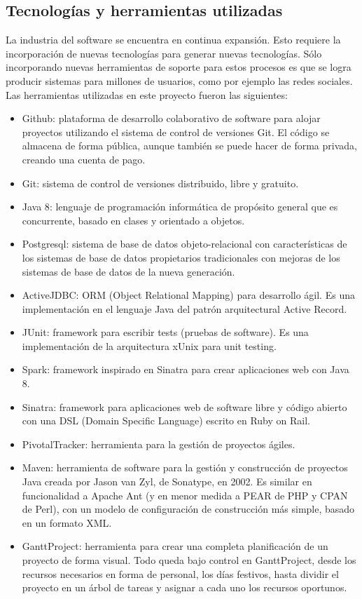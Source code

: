 \subsection{Tecnologías y herramientas utilizadas}
La industria del software se encuentra en continua expansión. Esto requiere la incorporación de nuevas tecnologías para generar
nuevas tecnologías. Sólo incorporando nuevas herramientas de soporte para estos procesos es que se logra producir sistemas para millones
de usuarios, como por ejemplo las redes sociales. \\
Las herramientas utilizadas en este proyecto fueron las siguientes:
 \begin{itemize}
 \item Github\cite{github}: plataforma de desarrollo colaborativo de software para alojar proyectos utilizando el sistema de control de versiones Git. El código se almacena de forma pública, aunque también se puede hacer de forma privada, creando una cuenta de pago. 
 \item Git\cite{git}: sistema de control de versiones distribuido, libre y gratuito.
 \item Java 8\cite{java8}: lenguaje de programación informática de propósito general que es concurrente, basado en clases y orientado a objetos.
 \item Postgresql\cite{postgresql}: sistema de base de datos objeto-relacional con características de los sistemas de base de datos propietarios tradicionales con mejoras de los sistemas de base de datos de la nueva generación.
 \item ActiveJDBC\cite{activejdbc}: ORM (Object Relational Mapping) para desarrollo ágil. Es una implementación en el lenguaje Java del patrón arquitectural Active Record.
 \item JUnit\cite{junit}: framework para escribir tests (pruebas de software). Es una implementación de la arquitectura xUnix para unit testing.
 \item Spark\cite{spark}: framework inspirado en Sinatra para crear aplicaciones web con Java 8.
 \item Sinatra\cite{sinatra}: framework para aplicaciones web de software libre y código abierto con una DSL (Domain Specific Language) escrito en Ruby on Rail.
 \item PivotalTracker\cite{pivotaltracker}: herramienta para la gestión de proyectos ágiles.
 \item Maven\cite{maven}: herramienta de software para la gestión y construcción de proyectos Java creada por Jason van Zyl, de Sonatype, en 2002. Es similar en funcionalidad a Apache Ant (y en menor medida a PEAR de PHP y CPAN de Perl), con un modelo de configuración de construcción más simple, basado en un formato XML.
 \item GanttProject\cite{gantproject}: herramienta para crear una completa planificación de un proyecto de forma visual. Todo queda bajo control en GanttProject, desde los recursos necesarios en forma de personal, los días festivos, hasta dividir el proyecto en un árbol de tareas y asignar a cada uno los recursos oportunos.
\end{itemize}

